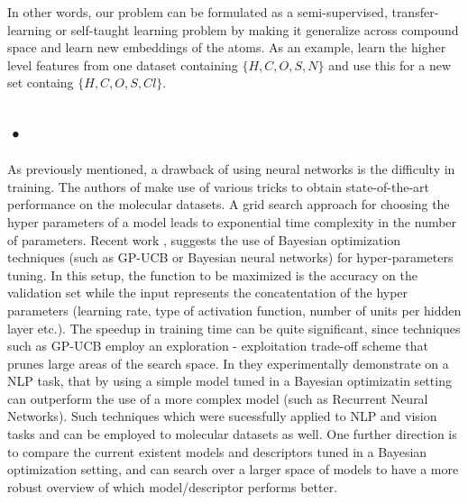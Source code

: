 \documentclass[10pt,journal,a4paper]{IEEEtran}
\begin{document}
%

In other words, our problem can be formulated as a semi-supervised, transfer-learning or self-taught learning problem by making it generalize across compound space and learn new embeddings of the atoms. As an example, learn the higher level features from one dataset containing $\{H, C, O, S, N\}$ and use this for a new set containg $\{H, C, O, S, Cl\}$.

\subsection*{•}
As previously mentioned, a drawback of using neural networks is the difficulty in training. The authors of \cite{montavon2012learning} make use of various tricks \cite{tricks} to obtain state-of-the-art performance on the molecular datasets. A grid search approach for choosing the hyper parameters of a model leads to exponential time complexity in the number of parameters.
Recent work \cite{hyperparameter}, \cite{citeulike} suggests the use of Bayesian optimization techniques (such as GP-UCB or Bayesian neural networks) for hyper-parameters tuning. In this setup, the function to be maximized is the accuracy on the validation set while the input represents the concatentation of the hyper parameters (learning rate, type of activation function, number of units per hidden layer etc.). The speedup in training time can be quite significant, since techniques such as GP-UCB employ an exploration - exploitation trade-off scheme that prunes large areas of the search space.
In \cite{citeulike} they experimentally demonstrate on a NLP task, that by using a simple model tuned in a Bayesian optimizatin setting can outperform the use of a more complex model (such as Recurrent Neural Networks).
Such techniques which were sucessfully applied to NLP and vision tasks and can be employed to molecular datasets as well.
One further direction is to compare the current existent models and descriptors tuned in a Bayesian optimization setting, and can search over a larger space of models to have a more robust overview of which model/descriptor performs better.



\end{document}
